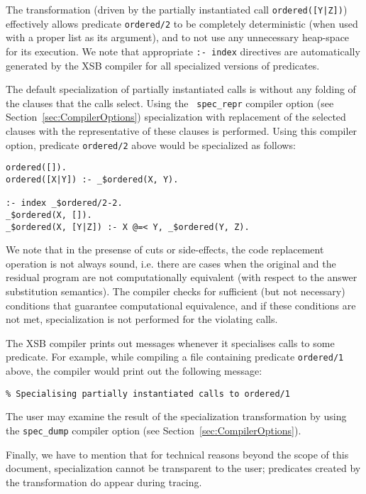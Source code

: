 The transformation (driven by the partially instantiated call
{\tt ordered([Y|Z])}) effectively allows predicate {\tt ordered/2}
to be completely deterministic (when used with a proper list as its
argument), and to not use any unnecessary heap-space for its
execution.  We note that appropriate {\tt :- index} directives are
automatically generated by the XSB compiler for all specialized
versions of predicates.

The default specialization of partially instantiated calls is without
any folding of the clauses that the calls select.  Using the {\tt
spec\_repr} compiler option (see Section~\ref{sec:CompilerOptions})
specialization with replacement of the selected clauses with the
representative of these clauses is performed.  Using this compiler
option, predicate {\tt ordered/2} above would be specialized as follows:
\begin{center}
\begin{minipage}{4.1in}
\begin{verbatim}
ordered([]).
ordered([X|Y]) :- _$ordered(X, Y).

:- index _$ordered/2-2.
_$ordered(X, []).
_$ordered(X, [Y|Z]) :- X @=< Y, _$ordered(Y, Z).
\end{verbatim}
\end{minipage}
\end{center}
We note that in the presense of cuts or side-effects, the code
replacement operation is not always sound, i.e.  there are cases when
the original and the residual program are not computationally equivalent
(with respect to the answer substitution semantics).  The compiler
checks for sufficient (but not necessary) conditions that guarantee
computational equivalence, and if these conditions are not met,
specialization is not performed for the violating calls.

The XSB compiler prints out messages whenever it specialises
calls to some predicate.  For example, while compiling a file
containing predicate {\tt ordered/1} above, the compiler would print
out the following message:
\begin{center}
{\tt	\% Specialising partially instantiated calls to ordered/1}
\end{center}
The user may examine the result of the specialization transformation
by using the {\tt spec\_dump} compiler option
(see Section~\ref{sec:CompilerOptions}).

Finally, we have to mention that for technical reasons beyond the scope of
this document, specialization cannot be transparent to the user; predicates
created by the transformation do appear during tracing.


